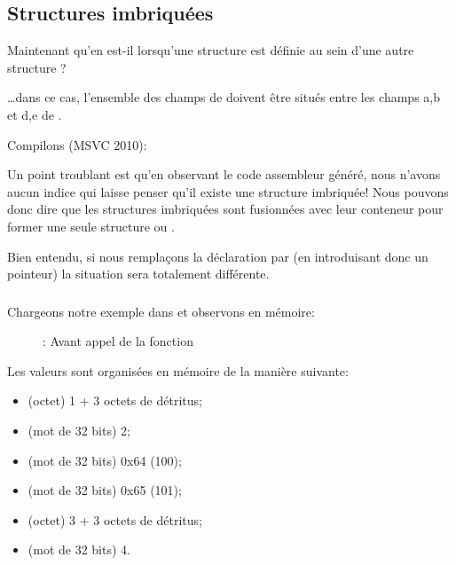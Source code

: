 \subsection{Structures imbriquées}

Maintenant qu'en est-il lorsqu'une structure est définie au sein d'une autre structure ?



\dots dans ce cas, l'ensemble des champs de  doivent être situés entre les champs a,b et 
d,e de .

Compilons (MSVC 2010):



Un point troublant est qu'en observant le code assembleur généré, nous n'avons aucun indice qui laisse penser 
qu'il existe une structure imbriquée!
Nous pouvons donc dire que les structures imbriquées sont fusionnées avec leur conteneur pour former une seule 
structure  ou .

Bien entendu, si nous remplaçons la déclaration  par 
(en introduisant donc un pointeur) la situation sera totalement différente.

\clearpage
\subsubsection{\olly}
\myindex{\olly}

Chargeons notre exemple dans \olly et observons  en mémoire:

\begin{figure}[H]
\centering
{}
\caption{\olly: Avant appel de la fonction \printf}
\label{fig:nested_olly}
\end{figure}

Les valeurs sont organisées en mémoire de la manière suivante:
\begin{itemize}
\item {} (octet) 1 + 3 octets de détritus;
\item {} (mot de 32 bits) 2;
\item {} (mot de 32 bits) 0x64 (100);
\item {} (mot de 32 bits) 0x65 (101);
\item {} (octet) 3 + 3 octets de détritus;
\item {} (mot de 32 bits) 4.
\end{itemize}

